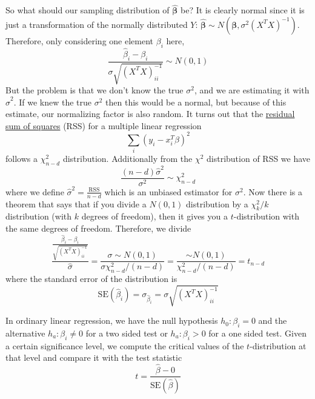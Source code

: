   So what should our sampling distribution of $\hat{\boldsymbol{\beta}}$ be? It is clearly normal since it is just a transformation of the normally distributed $Y$: $\hat{\boldsymbol{\beta}} \sim N (\boldsymbol{\beta}, \sigma^2 (X^T X)^{-1})$. Therefore, only considering one element $\beta_i$ here, 
  \begin{equation}
    \frac{\hat{\beta}_i - \beta_i}{\sigma \sqrt{ (X^T X)^{-1}_{ii}}} \sim N(0, 1)
  \end{equation}
  But the problem is that we don't know the true $\sigma^2$, and we are estimating it with $\hat{\sigma}^2$. If we knew the true $\sigma^2$ then this would be a normal, but because of this estimate, our normalizing factor is also random. It turns out that the \hyperref[def:residual-sum-of-squares]{residual sum of squares} (RSS) for a multiple linear regression
  \begin{equation}
    \sum_{i} (y_i - x_i^T \beta)^2
  \end{equation}
  follows a $\chi^2_{n-d}$ distribution. Additionally from the $\chi^2$ distribution of RSS we have 
  \begin{equation}
    \frac{(n - d) \hat{\sigma}^2}{\sigma^2} \sim \chi^2_{n-d}
  \end{equation}
  where we define $\hat{\sigma}^2 = \frac{\mathrm{RSS}}{n-d}$ which is an unbiased estimator for $\sigma^2$. Now there is a theorem that says that if you divide a $N(0, 1)$ distribution by a $\chi^2_k / k$ distribution (with $k$ degrees of freedom), then it gives you a $t$-distribution with the same degrees of freedom. Therefore, we divide 
  \begin{equation}
    \frac{\frac{\hat{\beta}_i - \beta_i}{\sqrt{ (X^T X)^{-1}_{ii}}}}{\hat{\sigma}} = \frac{ \sigma \sim N(0, 1)}{\sigma \chi^2_{n-d} / (n-d)} = \frac{\sim N(0, 1)}{\chi^2_{n-d} / (n-d)} = t_{n-d}
  \end{equation}
  where the standard error of the distribution is 
  \begin{equation}
    \mathrm{SE}(\hat{\beta}_i) = \sigma_{\hat{\beta}_i} = \sigma \sqrt{(X^T X)^{-1}_{ii}}
  \end{equation}

  In ordinary linear regression, we have the null hypothesis $h_0 : \beta_i = 0$ and the alternative $h_a : \beta_i \neq 0$ for a two sided test or $h_a : \beta_i > 0$ for a one sided test. Given a certain significance level, we compute the critical values of the $t$-distribution at that level and compare it with the test statistic 
  \begin{equation}
    t = \frac{\hat{\beta} - 0}{\mathrm{SE}(\hat{\beta})}
  \end{equation}

